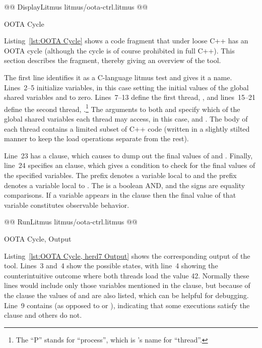 \documentclass[10]{article}
\begin{document}
\begin{listing}[tbp]
@@ DisplayLitmus litmus/oota-ctrl.litmus @@
\caption{OOTA Cycle}
\label{lst:OOTA Cycle}
\end{listing}

Listing~\ref{lst:OOTA Cycle}
shows a code fragment that under loose C++ has an OOTA cycle (although
the cycle is of course prohibited in full C++).
This section describes the fragment, thereby giving an overview of
the  tool.

The first line identifies it as a C-language litmus test and gives it
a name.
Lines~2--5 initialize variables, in this case setting the initial
values of the global shared variables  and  to zero.
Lines~7--13 define the first thread, , and lines~15--21
define the second thread, .\footnote{
	The ``P'' stands for ``process'', which is 's name
	for ``thread''.}
The arguments to both  and  specify which of
the global shared variables each thread may access, in this case, 
and .
The body of each thread contains a limited subset of C++ code
(written in a slightly stilted manner to keep the load operations separate
from the rest).

Line~23 has a  clause, which causes
 to dump out the final values of  and .
Finally, line~24 specifies an  clause, which gives a
condition to check for the final values of the specified variables.
The  prefix denotes a variable local to  and
the  prefix denotes a variable local to .
The \co{/\\} is a boolean AND, and the \co{=} signs are equality comparisons.
If a variable appears in the  clause then the final value of
that variable constitutes observable behavior.

\begin{listing}[tbp]
@@ RunLitmus litmus/oota-ctrl.litmus @@
\caption{OOTA Cycle,  Output}
\label{lst:OOTA Cycle, herd7 Output}
\end{listing}

Listing~\ref{lst:OOTA Cycle, herd7 Output} shows the corresponding output
of the  tool.
Lines~3 and~4 show the possible states, with line~4 showing the
counterintuitive outcome where both threads load the value 42.
Normally these lines would include only those variables mentioned
in the  clause, but because of the  clause
the values of  and  are also listed, which
can be helpful for debugging.
Line~9 contains  (as opposed to  or ),
indicating that some executions satisfy the  clause and
others do not.
\end{document}
